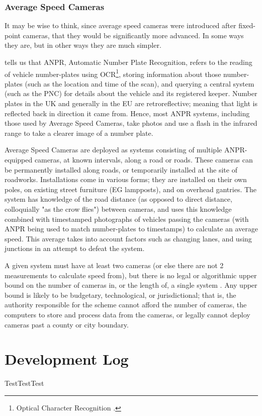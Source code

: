 \documentclass[11pt, a4paper, notitlepage]{report}
\begin{document}
\subsection{Average Speed Cameras}
It may be wise to think, since average speed cameras were introduced after fixed-point cameras, that they would be significantly more advanced. In some ways they are, but in other ways they are much simpler.

\citet{ANPRNPCC} tells us that ANPR, Automatic Number Plate Recognition, refers to the reading of vehicle number-plates using OCR\footnote{Optical Character Recognition \citep{OCR}.}, storing information about those number-plates (such as the location and time of the scan), and querying a central system (such as the PNC) for details about the vehicle and its registered keeper. Number plates in the UK and generally in the EU are retroreflective; meaning that light is reflected back in direction it came from. Hence, most ANPR systems, including those used by Average Speed Cameras, take photos and use a flash in the infrared range to take a clearer image of a number plate.

Average Speed Cameras are deployed as systems consisting of multiple ANPR-equipped cameras, at known intervals, along a road or roads. These cameras can be permanently installed along roads, or temporarily installed at the site of roadworks. Installations come in various forms; they are installed on their own poles, on existing street furniture (EG lampposts), and on overhead gantries. The system has knowledge of the road distance (as opposed to direct distance, colloquially "as the crow flies") between cameras, and uses this knowledge combined with timestamped photographs of vehicles passing the cameras (with ANPR being used to match number-plates to timestamps) to calculate an average speed. This average takes into account factors such as changing lanes, and using junctions in an attempt to defeat the system.

A given system must have at least two cameras (or else there are not 2 measurements to calculate speed from), but there is no legal or algorithmic upper bound on the number of cameras in, or the length of, a single system \citep{cbASC}. Any upper bound is likely to be budgetary, technological, or jurisdictional; that is, the authority responsible for the scheme cannot afford the number of cameras, the computers to store and process data from the cameras, or legally cannot deploy cameras past a county or city boundary.
\appendix
\chapter{Development Log}\label{app:GitLog}
TestTestTest


\end{document}
